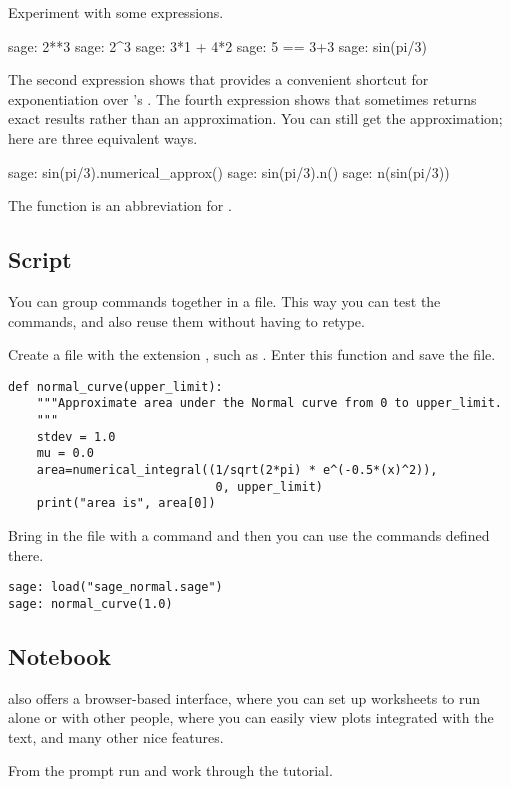 Experiment with some expressions.
\begin{sagecommandline}
sage: 2**3                                                                      
sage: 2^3
sage: 3*1 + 4*2
sage: 5 == 3+3
sage: sin(pi/3)
\end{sagecommandline}
The second expression 
shows that \Sage{} provides a convenient shortcut for exponentiation over
\python's .
The fourth expression
shows that \Sage{} sometimes returns exact results rather than an
approximation.
You can still get the approximation; here are three equivalent ways.
\begin{sagecommandline}
sage: sin(pi/3).numerical_approx()
sage: sin(pi/3).n()
sage: n(sin(pi/3))  
\end{sagecommandline}
\noindent
The function  is an abbreviation for 
.


\subsection{Script}
You can group \Sage{} commands together in a file.
This way you can test the commands, 
and also reuse them without having to retype.

Create a file with the extension , such as .
Enter this function and save the file.
\begin{lstlisting}[style=python]
def normal_curve(upper_limit):
    """Approximate area under the Normal curve from 0 to upper_limit.
    """
    stdev = 1.0
    mu = 0.0
    area=numerical_integral((1/sqrt(2*pi) * e^(-0.5*(x)^2)),
                             0, upper_limit)    
    print("area is", area[0])
\end{lstlisting}
Bring in the file with a  command
and then you can use the commands defined there.
\begin{lstlisting}[style=python]
sage: load("sage_normal.sage")
sage: normal_curve(1.0)   
\end{lstlisting}


\subsection{Notebook}
\Sage{} also offers a browser-based interface, where you can set up
worksheets to run alone or with other people, where you can easily
view plots integrated with the text, and many other nice features.

From the \Sage{} prompt run  and
work through the tutorial.
\endinput


TODO:
  1) how to use notebook to do exercises?